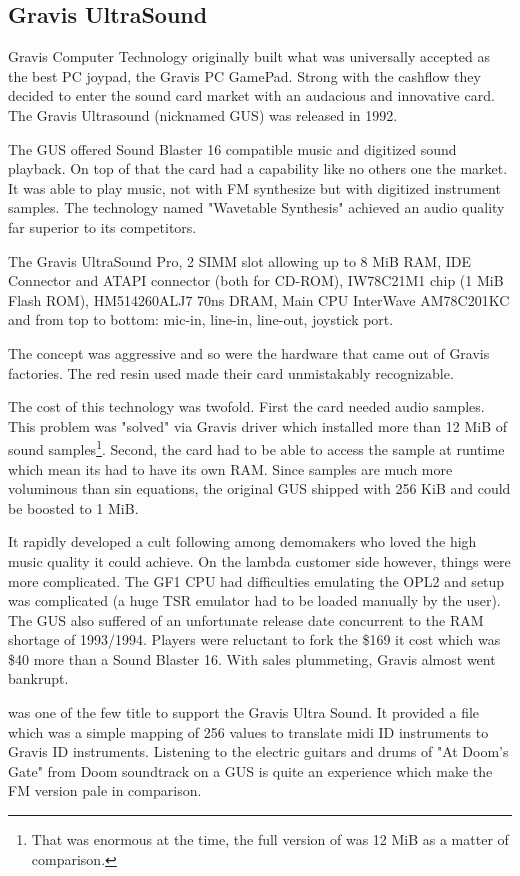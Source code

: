 \subsection{Gravis UltraSound}
Gravis Computer Technology originally built what was universally accepted as the best PC joypad, the Gravis PC GamePad. Strong with the cashflow they decided to enter the sound card market with an audacious and innovative card. The Gravis Ultrasound (nicknamed GUS) was released in 1992.\\
\par
The GUS offered Sound Blaster 16 compatible music and digitized sound playback. On top of that the card had a capability like no others one the market. It was able to play music, not with FM synthesize but with digitized instrument samples. The technology named "Wavetable Synthesis" achieved an audio quality far superior to its competitors.\\


\par
The Gravis UltraSound Pro,  2 SIMM slot allowing up to 8 MiB RAM,  IDE Connector and  ATAPI connector (both for CD-ROM),  IW78C21M1 chip (1 MiB Flash ROM),  HM514260ALJ7 70ns DRAM,  Main CPU InterWave AM78C201KC and  from top to bottom: mic-in, line-in, line-out, joystick port.\\
\par
The concept was aggressive and so were the hardware that came out of Gravis factories. The red resin used made their card unmistakably recognizable.\\
\par
The cost of this technology was twofold. First the card needed audio samples. This problem was "solved" via Gravis driver which installed more than 12 MiB of sound samples\footnote{That was enormous at the time, the full version of \doom was 12 MiB as a matter of comparison.}. Second, the card had to be able to access the sample at runtime which mean its had to have its own RAM. Since samples are much more voluminous than sin equations, the original GUS shipped with 256 KiB and could be boosted to 1 MiB.\\
\par
It rapidly developed a cult following among demomakers who loved the high music quality it could achieve. On the lambda customer side however, things were more complicated. The GF1 CPU had difficulties emulating the OPL2 and setup was complicated (a huge TSR emulator had to be loaded manually by the user). The GUS also suffered of an unfortunate release date concurrent to the RAM shortage of 1993/1994. Players were reluctant to fork the \$169 it cost which was \$40 more than a Sound Blaster 16. With sales plummeting, Gravis almost went bankrupt.\\
\par
 \doom was one of the few title to support the Gravis Ultra Sound. It provided a  file which was a simple mapping of 256 values to translate midi ID instruments to Gravis ID instruments. Listening to the electric guitars and drums of "At Doom's Gate" from Doom soundtrack on a GUS is quite an experience which make the FM version pale in comparison.